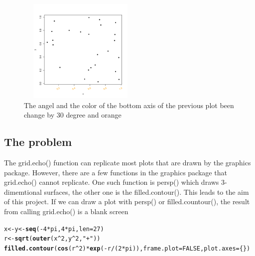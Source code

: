 \documentclass[a4paper,10pt]{article}\usepackage[]{graphicx}\usepackage[]{color}
\makeatletter
\newcommand{\hlnum}[1]{\textcolor[rgb]{0.686,0.059,0.569}{#1}}%
\newcommand{\hlstr}[1]{\textcolor[rgb]{0.192,0.494,0.8}{#1}}%
\newcommand{\hlopt}[1]{\textcolor[rgb]{0,0,0}{#1}}%
\newcommand{\hlstd}[1]{\textcolor[rgb]{0.345,0.345,0.345}{#1}}%
\newcommand{\hlkwb}[1]{\textcolor[rgb]{0.69,0.353,0.396}{#1}}%
\newcommand{\hlkwc}[1]{\textcolor[rgb]{0.333,0.667,0.333}{#1}}%
\newcommand{\hlkwd}[1]{\textcolor[rgb]{0.737,0.353,0.396}{\textbf{#1}}}%
\newenvironment{kframe}{%
 \def\at@end@of@kframe{}%
 \ifinner\ifhmode%
  \def\at@end@of@kframe{\end{minipage}}%
  \begin{minipage}{\columnwidth}%
 \fi\fi%
 \def\FrameCommand##1{\hskip\@totalleftmargin \hskip-\fboxsep
 \colorbox{shadecolor}{##1}\hskip-\fboxsep
     \hskip-\linewidth \hskip-\@totalleftmargin \hskip\columnwidth}%
 \MakeFramed {\advance\hsize-\width
   \@totalleftmargin\z@ \linewidth\hsize
   \@setminipage}}%
 {\par\unskip\endMakeFramed%
 \at@end@of@kframe}
\newenvironment{knitrout}{}{} %
\makeatother
\begin{document}
\begin{figure}[h]
\begin{center}
  \includegraphics[height = 5cm, width = 6cm]{figure/gridedit.pdf}
  \caption{The angel and the color of the bottom axis of the previous plot been change by 30 degree and orange}
  	\label{figure3}
\end{center}
\end{figure}





\subsection{The problem}
The grid.echo() function can replicate most plots that are drawn by the graphics package. However, there are a few functions in the graphics package that grid.echo() cannot replicate. One such function is persp() which draws 3-dimemtional surfaces, the other one is the filled.contour(). This leads to the aim of this project. If we can draw a plot with persp() or filled.countour(), the result from calling grid.echo() is a blank screen 

\begin{knitrout}
\color{fgcolor}\begin{kframe}
\begin{alltt}
\hlstd{x} \hlkwb{<-} \hlstd{y} \hlkwb{<-} \hlkwd{seq}\hlstd{(}\hlopt{-}\hlnum{4}\hlopt{*}\hlstd{pi,} \hlnum{4}\hlopt{*}\hlstd{pi,} \hlkwc{len} \hlstd{=} \hlnum{27}\hlstd{)}
\hlstd{r} \hlkwb{<-} \hlkwd{sqrt}\hlstd{(}\hlkwd{outer}\hlstd{(x}\hlopt{^}\hlnum{2}\hlstd{, y}\hlopt{^}\hlnum{2}\hlstd{,} \hlstr{"+"}\hlstd{))}
\hlkwd{filled.contour}\hlstd{(}\hlkwd{cos}\hlstd{(r}\hlopt{^}\hlnum{2}\hlstd{)}\hlopt{*}\hlkwd{exp}\hlstd{(}\hlopt{-}\hlstd{r}\hlopt{/}\hlstd{(}\hlnum{2}\hlopt{*}\hlstd{pi)),} \hlkwc{frame.plot} \hlstd{=} \hlnum{FALSE}\hlstd{,} \hlkwc{plot.axes} \hlstd{= \{\})}
\end{alltt}
\end{kframe}
\end{knitrout}
\end{document}
